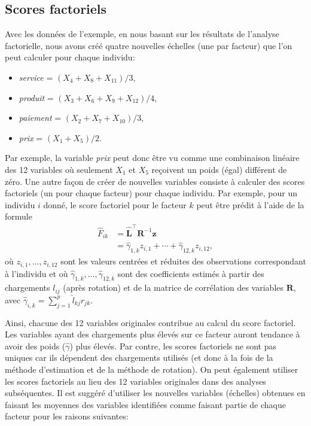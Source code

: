 \documentclass[
  11pt,
  letterpaper,
]{book}
\providecommand{\tightlist}{%
  \setlength{\itemsep}{0pt}\setlength{\parskip}{0pt}}
\theoremstyle{definition}
\theoremstyle{definition}
\theoremstyle{definition}
\theoremstyle{remark}
\begin{document}
\hypertarget{scores-factoriels}{%
\subsection{Scores factoriels}\label{scores-factoriels}}

Avec les données de l'exemple, en nous basant sur les résultats de l'analyse factorielle, nous avons créé quatre nouvelles échelles (une par facteur) que l'on peut calculer pour chaque individu:

\begin{itemize}
\tightlist
\item
  \emph{service} = \((X_4+X_8+X_{11})/3\),
\item
  \emph{produit} = \((X_3+X_6+X_9+X_{12})/4\),
\item
  \emph{paiement} = \((X_2+X_7+X_{10})/3\),
\item
  \emph{prix} = \((X_1+X_5)/2\).
\end{itemize}

Par exemple, la variable \emph{prix} peut donc être vu comme une combinaison linéaire des 12
variables où seulement \(X_1\) et \(X_5\) reçoivent un poids (égal) différent de zéro. Une autre façon de créer de nouvelles variables consiste à calculer des scores factoriels (un pour chaque facteur) pour chaque individu. Par exemple, pour un individu \(i\) donné, le score factoriel pour le facteur \(k\) peut être prédit à l'aide de la formule
\begin{align*}
\hat{F}_{ik} &= \widehat{\mathbf{L}}^{\top}\mathbf{R}^{-1}\boldsymbol{z}\\&=
\widehat{\gamma}_{1, k} z_{i, 1} + \cdots + \widehat{\gamma}_{12, k}z_{i, 12}, 
\end{align*}
où \(z_{i, 1}, \ldots, z_{i, 12}\) sont les valeurs centrées et réduites des observations correspondant à l'individu et où \(\widehat{\gamma}_{1, k}, \ldots, \widehat{\gamma}_{12, k}\) sont des coefficients estimés à partir des chargements \(l_{ij}\) (après rotation) et de la matrice de corrélation des variables \(\mathbf{R}\), avec \(\widehat{\gamma}_{i, k}=\sum_{j=1}^p \hat{l}_{kj}r_{jk}\).

Ainsi, chacune des 12 variables originales contribue au calcul du score
factoriel. Les variables ayant des chargements plus élevés sur ce facteur auront tendance à avoir des poids (\(\widehat{\gamma}\)) plus élevés. Par contre, les scores factoriels ne sont pas uniques car ils dépendent des chargements utilisés (et donc à la fois de la méthode d'estimation et de la méthode de rotation).
On peut également utiliser les scores factoriels au lieu des 12 variables
originales dans des analyses subséquentes. Il est suggéré d'utiliser les nouvelles variables (échelles) obtenues en faisant les moyennes des variables identifiées comme faisant partie de chaque facteur pour les raisons suivantes:
\end{document}

